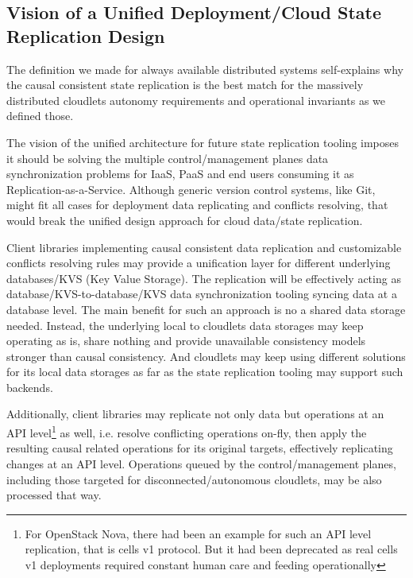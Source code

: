 \documentclass[conference]{IEEEtran}
\begin{document}
\subsection{Vision of a Unified Deployment/Cloud State Replication Design}

The definition we made for always available distributed systems self-explains
why the causal consistent state replication is the best match for the
massively distributed cloudlets autonomy requirements and operational
invariants as we defined those.

The vision of the unified architecture for future state replication tooling
imposes it should be solving the multiple control/management planes data
synchronization problems for IaaS, PaaS and end users consuming it as
Replication-as-a-Service. Although generic version control systems, like Git,
might fit all cases for deployment data replicating and conflicts resolving,
that would break the unified design approach for cloud data/state replication.

Client libraries implementing causal consistent data replication and
customizable conflicts resolving rules may provide a unification layer for
different underlying databases/KVS (Key Value Storage). The replication will be
effectively acting as database/KVS-to-database/KVS data synchronization tooling
syncing data at a database level. The main benefit for such an approach is no a
shared data storage needed. Instead, the underlying local to cloudlets data
storages may keep operating as is, share nothing and provide unavailable
consistency models stronger than causal consistency. And cloudlets may keep
using different solutions for its local data storages as far as the state
replication tooling may support such backends.

Additionally, client libraries may replicate not only data but operations at an
API level\footnote{For OpenStack Nova, there had been an example for such an
API level replication, that is cells v1 protocol. But it had been deprecated as
real cells v1 deployments required constant human care and feeding
operationally} as well, i.e. resolve conflicting operations on-fly, then apply
the resulting causal related operations for its original targets, effectively
replicating changes at an API level. Operations queued by the control/management planes, including
those targeted for disconnected/autonomous cloudlets, may be also processed
that way.
\end{document}
